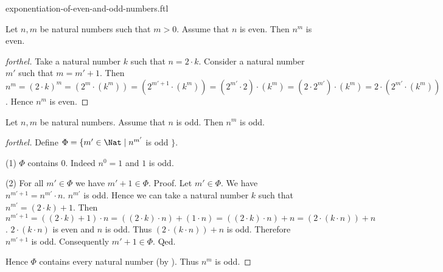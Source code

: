 \documentclass{naproche-library}
\begin{document}
\begin{smodule}[title=Exponentiation of Even and Odd Numbers]{exponentiation-of-even-and-odd-numbers.ftl}

\begin{proposition}[forthel,id=ARITHMETIC_15_1023659658745214]
  Let $n, m$ be natural numbers such that $m > 0$.
  Assume that $n$ is even.
  Then $n^{m}$ is even.
\end{proposition}
\begin{proof}[forthel]
  Take a natural number $k$ such that $n = 2 \cdot k$.
  Consider a natural number $m'$ such that $m = m' + 1$.
  Then $n^{m}
    = (2 \cdot k)^{m}
    = (2^{m} \cdot (k^{m}))
    = (2^{m' + 1} \cdot (k^{m}))
    = (2^{m'} \cdot 2) \cdot (k^{m})
    = (2 \cdot 2^{m'}) \cdot (k^{m})
    = 2 \cdot (2^{m'} \cdot (k^{m}))$.
  Hence $n^{m}$ is even.
\end{proof}

\begin{proposition}[forthel,id=ARITHMETIC_15_0021200236556985]
  Let $n, m$ be natural numbers.
  Assume that $n$ is odd.
  Then $n^{m}$ is odd.
\end{proposition}
\begin{proof}[forthel]
  Define $\Phi = \{ m' \in \Nat \mid n^{m'}$ is odd $\}$.

  (1) $\Phi$ contains $0$.
  Indeed $n^{0} = 1$ and $1$ is odd.

  (2) For all $m' \in \Phi$ we have $m' + 1 \in \Phi$. \newline
  Proof.
    Let $m' \in \Phi$.
    We have $n^{m' + 1} = n^{m'} \cdot n$.
    $n^{m'}$ is odd.
    Hence we can take a natural number $k$ such that $n^{m'} = (2 \cdot k) + 1$.
    Then $n^{m' + 1}
      = ((2 \cdot k) + 1) \cdot n
      = ((2 \cdot k) \cdot n) + (1 \cdot n)
      = ((2 \cdot k) \cdot n) + n
      = (2 \cdot (k \cdot n)) + n$.
    $2 \cdot (k \cdot n)$ is even and $n$ is odd.
    Thus $(2 \cdot (k \cdot n)) + n$ is odd.
    Therefore $n^{m' + 1}$ is odd.
    Consequently $m' + 1 \in \Phi$.
  Qed.

  Hence $\Phi$ contains every natural number (by ).
  Thus $n^{m}$ is odd.
\end{proof}
\end{smodule}
\end{document}
